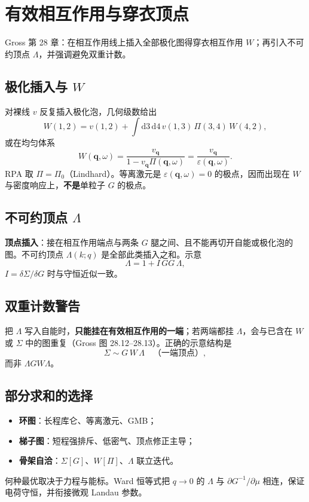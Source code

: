 \section{有效相互作用与穿衣顶点}

Gross 第 28 章：在相互作用线上插入全部极化图得穿衣相互作用 $W$；再引入不可约顶点 $\Lambda$，并强调避免双重计数。

\subsection{极化插入与 $W$}

对裸线 $v$ 反复插入极化泡，几何级数给出
\begin{equation}
  W(1,2)
  =v(1,2)
  +\int\mathrm{d}3\,\mathrm{d}4\,
  v(1,3)\,
  \Pi(3,4)\,
  W(4,2),
\label{eq:W_def}
\end{equation}
或在均匀体系
\begin{equation}
  W(\mathbf{q},\omega)
  =\frac{v_{\mathbf{q}}}{1-v_{\mathbf{q}}\Pi(\mathbf{q},\omega)}
  =\frac{v_{\mathbf{q}}}{\varepsilon(\mathbf{q},\omega)}.
\end{equation}
RPA 取 $\Pi=\Pi_0$（Lindhard）。等离激元是 $\varepsilon(\mathbf{q},\omega)=0$ 的极点，因而出现在 $W$ 与密度响应上，\textbf{不是}单粒子 $G$ 的极点。

\subsection{不可约顶点 $\Lambda$}

\textbf{顶点插入}：接在相互作用端点与两条 $G$ 腿之间、且不能再切开自能或极化泡的图。不可约顶点 $\Lambda(k;q)$ 是全部此类插入之和。示意
\begin{equation}
  \Lambda
  =1
  +I\,G G\,\Lambda,
\end{equation}
$I=\delta\Sigma/\delta G$ 时与守恒近似一致。

\subsection{双重计数警告}

把 $\Lambda$ 写入自能时，\textbf{只能挂在有效相互作用的一端}；若两端都挂 $\Lambda$，会与已含在 $W$ 或 $\Sigma$ 中的图重复（Gross 图 28.12--28.13）。正确的示意结构是
\begin{equation}
  \Sigma
  \sim
  G\,W\,\Lambda
  \quad\text{（一端顶点）},
\end{equation}
而非 $\Lambda G W\Lambda$。

\subsection{部分求和的选择}

\begin{itemize}
  \item \textbf{环图}：长程库仑、等离激元、GMB；
  \item \textbf{梯子图}：短程强排斥、低密气、顶点修正主导；
  \item \textbf{骨架自洽}：$\Sigma[G]$、$W[\Pi]$、$\Lambda$ 联立迭代。
\end{itemize}
何种最优取决于力程与能标。Ward 恒等式把 $q\to0$ 的 $\Lambda$ 与 $\partial G^{-1}/\partial\mu$ 相连，保证电荷守恒，并衔接微观 Landau 参数。
